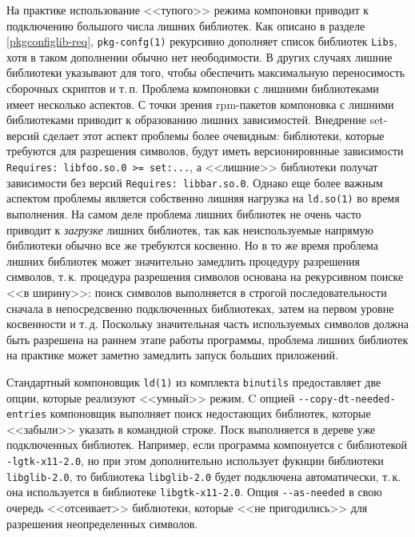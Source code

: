 \documentclass[russian,a4paper,12pt,titlepage]{article}
\begin{document}
На практике использование <<тупого>> режима компоновки приводит к подключению большого числа лишних библиотек.
Как описано в разделе \ref{pkgconfiglib-req}, \verb|pkg-confg(1)| рекурсивно дополняет список библиотек \verb|Libs|,
хотя в таком дополнении обычно нет неободимости.  В других случаях лишние библиотеки указывают для того, чтобы обеспечить
максимальную переносимость сборочных скриптов и т.\,п.  Проблема компоновки с лишними библиотеками имеет несколько аспектов.
С точки зрения rpm-пакетов компоновка с лишними библиотеками приводит к образованию лишних зависимостей.  Внедрение
set-версий сделает этот аспект проблемы более очевидным: библиотеки, которые требуются для разрешения символов, будут
иметь версионировнные зависимости \texttt{Requires: libfoo.so.0 >= set:...}, а <<лишние>> библиотеки получат зависимости
без версий \texttt{Requires: libbar.so.0}.  Однако еще более важным аспектом проблемы является собственно лишняя нагрузка
на \verb|ld.so(1)| во время выполнения.  На самом деле проблема лишних библиотек не очень часто приводит к \emph{загрузке}
лишних библиотек, так как неиспользуемые напрямую библиотеки обычно все же требуются косвенно.  Но в то же время проблема
лишних библиотек может значительно замедлить процедуру разрешения символов, т.\,к. процедура разрешения символов
основана на рекурсивном поиске <<в ширину>>: поиск символов выполняется в строгой последовательности сначала в непосредсвенно
подключенных библиотеках, затем на первом уровне косвенности и т.\,д.  Поскольку значительная часть используемых символов
должна быть разрешена на раннем этапе работы программы, проблема лишних библиотек на практике может заметно замедлить
запуск больших приложений.

Стандартный компоновщик \verb|ld(1)| из комплекта \verb|binutils| предоставляет две опции, которые реализуют <<умный>> режим.
C опцией \verb|--copy-dt-needed-entries| компоновщик выполняет поиск недостающих библиотек, которые <<забыли>> указать
в командной строке.  Поск выполняется в дереве уже подключенных библиотек.  Например, если программа компонуется
с библиотекой \verb|-lgtk-x11-2.0|, но при этом дополнительно использует фукнции библиотеки \verb|libglib-2.0|, то
библиотека \verb|libglib-2.0| будет подключена автоматически, т.\,к. она используется в библиотеке \verb|libgtk-x11-2.0|.
Опция \verb|--as-needed| в свою очередь <<отсеивает>> библиотеки, которые <<не пригодились>> для разрешения неопределенных символов.
\end{document}
